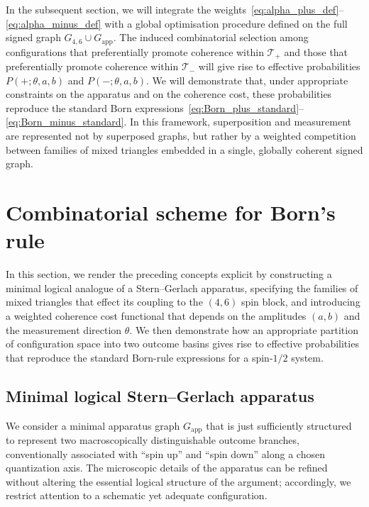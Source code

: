 \documentclass[11pt,a4paper]{article}
\numberwithin{equation}{section}
\begin{document}
In the subsequent section, we will integrate the weights~\eqref{eq:alpha_plus_def}--\eqref{eq:alpha_minus_def} with a global optimisation procedure defined on the full signed graph $G_{4,6}\cup G_{\mathrm{app}}$. The induced combinatorial selection among configurations that preferentially promote coherence within $\mathcal{T}_+$ and those that preferentially promote coherence within $\mathcal{T}_-$ will give rise to effective probabilities $P(+;\theta,a,b)$ and $P(-;\theta,a,b)$. We will demonstrate that, under appropriate constraints on the apparatus and on the coherence cost, these probabilities reproduce the standard Born expressions~\eqref{eq:Born_plus_standard}--\eqref{eq:Born_minus_standard}. In this framework, superposition and measurement are represented not by superposed graphs, but rather by a weighted competition between families of mixed triangles embedded in a single, globally coherent signed graph.

\section{Combinatorial scheme for Born's rule}
\label{sec:Born_scheme}

In this section, we render the preceding concepts explicit by constructing a minimal logical analogue of a Stern--Gerlach apparatus, specifying the families of mixed triangles that effect its coupling to the $(4,6)$ spin block, and introducing a weighted coherence cost functional that depends on the amplitudes $(a,b)$ and the measurement direction $\theta$. We then demonstrate how an appropriate partition of configuration space into two outcome basins gives rise to effective probabilities that reproduce the standard Born-rule expressions for a spin-$1/2$ system.

\subsection{Minimal logical Stern--Gerlach apparatus}
\label{subsec:min_app}

We consider a minimal apparatus graph $G_{\mathrm{app}}$ that is just sufficiently structured to represent two macroscopically distinguishable outcome branches, conventionally associated with ``spin up'' and ``spin down'' along a chosen quantization axis. The microscopic details of the apparatus can be refined without altering the essential logical structure of the argument; accordingly, we restrict attention to a schematic yet adequate configuration.
\end{document}
